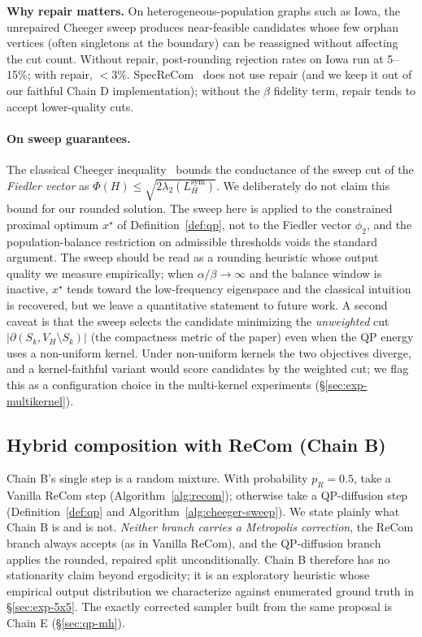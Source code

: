 \documentclass[11pt]{article}
\begin{document}
\textbf{Why repair matters.} On heterogeneous-population graphs such
as Iowa, the unrepaired Cheeger sweep produces near-feasible
candidates whose few orphan vertices (often singletons at the
boundary) can be reassigned without affecting the cut count.
Without repair, post-rounding rejection rates on Iowa run at 5--15\%;
with repair, $<3\%$. SpecReCom~\cite{davies2025spectral} does not use
repair (and we keep it out of our faithful Chain D
implementation); without the $\beta$ fidelity term, repair tends to
accept lower-quality cuts.

\paragraph{On sweep guarantees.} The classical Cheeger
inequality~\cite{chung1997spectral} bounds the conductance of the
sweep cut of the \emph{Fiedler vector} as
$\Phi(H) \le \sqrt{2 \lambda_2(L_H^{\mathrm{sym}})}$. We deliberately
do not claim this bound for our rounded solution. The sweep here is
applied to the constrained proximal optimum $x^\star$ of
Definition~\ref{def:qp}, not to the Fiedler vector $\phi_2$, and the population-balance
restriction on admissible thresholds voids the standard argument. The
sweep should be read as a rounding heuristic whose output quality we
measure empirically; when $\alpha/\beta \to \infty$ and the balance
window is inactive, $x^\star$ tends toward the low-frequency eigenspace
and the classical intuition is recovered, but we leave a quantitative
statement to future work. A second caveat is that the sweep selects the
candidate minimizing the \emph{unweighted} cut $|\partial(S_k, V_H
\setminus S_k)|$ (the compactness metric of the paper) even when
the QP energy uses a non-uniform kernel. Under non-uniform kernels the
two objectives diverge, and a kernel-faithful variant would score
candidates by the weighted cut; we flag this as a configuration choice
in the multi-kernel experiments (\S\ref{sec:exp-multikernel}).

\subsection{Hybrid composition with ReCom (Chain B)}\label{sec:hybrid-mh}

Chain B's single step is a random mixture. With probability
$p_R = 0.5$, take a Vanilla ReCom step (Algorithm~\ref{alg:recom});
otherwise take a QP-diffusion step (Definition~\ref{def:qp} and
Algorithm~\ref{alg:cheeger-sweep}). We state plainly what Chain B is
and is not. \emph{Neither branch carries a Metropolis correction}, the ReCom branch always accepts (as in Vanilla ReCom), and the
QP-diffusion branch applies the rounded, repaired split
unconditionally. Chain B therefore has no stationarity claim beyond
ergodicity; it is an exploratory heuristic whose empirical output
distribution we characterize against enumerated ground truth in
\S\ref{sec:exp-5x5}. The exactly corrected sampler built from the same
proposal is Chain E (\S\ref{sec:qp-mh}).
\end{document}
